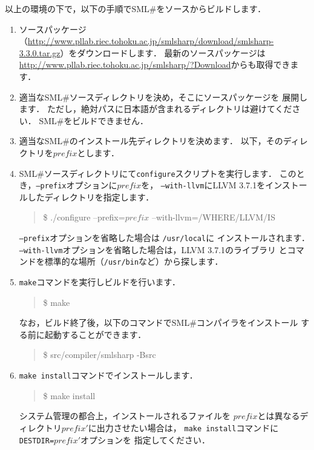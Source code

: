 \documentclass{jbook}
\newcommand{\smlsharp}{SML\#}
\newcommand{\version}{3.3.0}
\newcommand\eurl[1]{{\edef\eurlTMP{{#1}}\expandafter\url\eurlTMP}}
\newenvironment{program}{\begin{quote}\begin{tt}}%
                        {\end{tt}\end{quote}}
\begin{document}
	以上の環境の下で，以下の手順で\smlsharp{}をソースからビルドします．
\begin{enumerate}
\item
	ソースパッケージ（\eurl{http://www.pllab.riec.tohoku.ac.jp/smlsharp/download/smlsharp-\version.tar.gz}）をダウンロードします．
	最新のソースパッケージは
\url{http://www.pllab.riec.tohoku.ac.jp/smlsharp/?Download}からも取得できます．
\item 適当な\smlsharp{}ソースディレクトリを決め，そこにソースパッケージを
展開します．
	ただし，絶対パスに日本語が含まれるディレクトリは避けてください．
	\smlsharp{}をビルドできません．
\item 適当な\smlsharp{}のインストール先ディレクトリを決めます．
	以下，そのディレクトリを$\mathit{prefix}$とします．
\item
	\smlsharp{}ソースディレクトリにて{\tt configure}スクリプトを実行します．
	このとき，{\tt --prefix}オプションに$\mathit{prefix}$を，
{\tt --with-llvm}にLLVM 3.7.1をインストールしたディレクトリを指定します．
\begin{program}
\$ ./configure --prefix=$\mathit{prefix}$ --with-llvm=/WHERE/LLVM/IS
\end{program}
	{\tt --prefix}オプションを省略した場合は {\tt /usr/local}に
インストールされます．
	{\tt --with-llvm}オプションを省略した場合は，LLVM 3.7.1のライブラリ
とコマンドを標準的な場所（{\tt /usr/bin}など）から探します．
\item
	{\tt make}コマンドを実行しビルドを行います．
\begin{program}
\$ make
\end{program}
	なお，ビルド終了後，以下のコマンドで\smlsharp{}コンパイラをインストール
する前に起動することができます．
\begin{program}
\$ src/compiler/smlsharp -Bsrc
\end{program}
\item
	{\tt make install}コマンドでインストールします．
\begin{program}
\$ make install
\end{program}
	システム管理の都合上，インストールされるファイルを
$\mathit{prefix}$とは異なるディレクトリ$\mathit{prefix}'$に出力させたい場合は，
{\tt make install}コマンドに{\tt DESTDIR=$\mathit{prefix}'$}オプションを
指定してください．
\end{enumerate}
\end{document}
